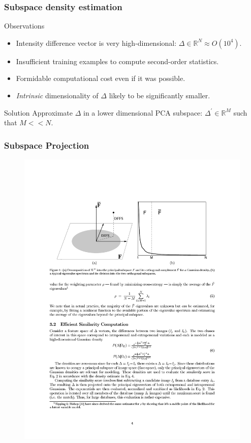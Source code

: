 \documentclass{beamer}
\begin{document}
\begin{frame}
\frametitle{Subspace density estimation}
\begin{block}{Observations}
\begin{itemize}
\item Intensity difference vector is very high-dimensional: $\Delta \in \mathbb{R}^N \approx O(10^4)$.
\pause
\item Insufficient training examples to compute second-order statistics.
\pause
\item Formidable computational cost even if it was possible.
\pause
\item \emph{Intrinsic} dimensionality of $\Delta$ likely to be significantly smaller.
\end{itemize}
\end{block}
\pause
\begin{block}{Solution}
Approximate $\Delta$ in a lower dimensional PCA subspace: $\Delta^\prime \in \mathbb{R}^M$ such that $M << N$.
\end{block}
\end{frame}

\begin{frame}
\frametitle{Subspace Projection}
\begin{figure}[H]
\centering
\includegraphics[width=\textwidth, trim=1in 6.4in 1in 1.6in, clip]{Moghaddam6}
\end{figure}
\end{frame}
\end{document}
